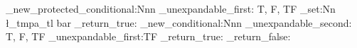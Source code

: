 \prg_new_protected_conditional:Nnn
  \example_unexpandable_first:
  { T, F, TF }
  {
    \tl_set:Nn
      \l_tmpa_tl
      { bar }
    \prg_return_true:
  }
\prg_new_conditional:Nnn  %
  \example_unexpandable_second:
  { T, F, TF }
  {
    \example_unexpandable_first:TF
      { \prg_return_true: }
      { \prg_return_false: }
  }
